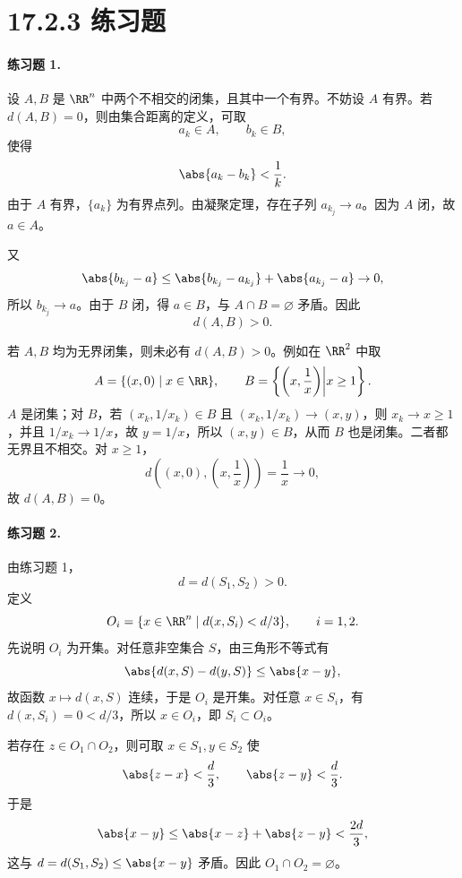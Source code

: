 \section*{17.2.3 练习题}

\paragraph{练习题 1.}
\begin{xsolution}
设 $A,B$ 是 $\RR^n$ 中两个不相交的闭集，且其中一个有界。不妨设 $A$ 有界。若 $d(A,B)=0$，则由集合距离的定义，可取
\[
  a_k\in A,\qquad b_k\in B,
\]
使得
\[
  \abs{a_k-b_k}<\frac1k.
\]
由于 $A$ 有界，$\{a_k\}$ 为有界点列。由凝聚定理，存在子列 $a_{k_j}\to a$。因为 $A$ 闭，故 $a\in A$。

又
\[
  \abs{b_{k_j}-a}
  \leq\abs{b_{k_j}-a_{k_j}}+\abs{a_{k_j}-a}\to0,
\]
所以 $b_{k_j}\to a$。由于 $B$ 闭，得 $a\in B$，与 $A\cap B=\varnothing$ 矛盾。因此
\[
  d(A,B)>0.
\]

若 $A,B$ 均为无界闭集，则未必有 $d(A,B)>0$。例如在 $\RR^2$ 中取
\[
  A=\{(x,0)\mid x\in\RR\},
  \qquad
  B=\left\{\left(x,\frac1x\right)\middle|x\geq1\right\}.
\]
$A$ 是闭集；对 $B$，若 $(x_k,1/x_k)\in B$ 且 $(x_k,1/x_k)\to(x,y)$，则 $x_k\to x\geq1$，并且 $1/x_k\to1/x$，故 $y=1/x$，所以 $(x,y)\in B$，从而 $B$ 也是闭集。二者都无界且不相交。对 $x\geq1$，
\[
  d\left((x,0),\left(x,\frac1x\right)\right)=\frac1x\to0,
\]
故 $d(A,B)=0$。
\end{xsolution}

\paragraph{练习题 2.}
\begin{xsolution}
由练习题 1，
\[
  d=d(S_1,S_2)>0.
\]
定义
\[
  O_i=\{x\in\RR^n\mid d(x,S_i)<d/3\},\qquad i=1,2.
\]
先说明 $O_i$ 为开集。对任意非空集合 $S$，由三角形不等式有
\[
  \abs{d(x,S)-d(y,S)}\leq\abs{x-y},
\]
故函数 $x\mapsto d(x,S)$ 连续，于是 $O_i$ 是开集。对任意 $x\in S_i$，有 $d(x,S_i)=0<d/3$，所以 $x\in O_i$，即 $S_i\subset O_i$。

若存在 $z\in O_1\cap O_2$，则可取 $x\in S_1,y\in S_2$ 使
\[
  \abs{z-x}<\frac d3,
  \qquad
  \abs{z-y}<\frac d3.
\]
于是
\[
  \abs{x-y}\leq\abs{x-z}+\abs{z-y}<\frac{2d}{3},
\]
这与 $d=d(S_1,S_2)\leq\abs{x-y}$ 矛盾。因此 $O_1\cap O_2=\varnothing$。
\end{xsolution}

